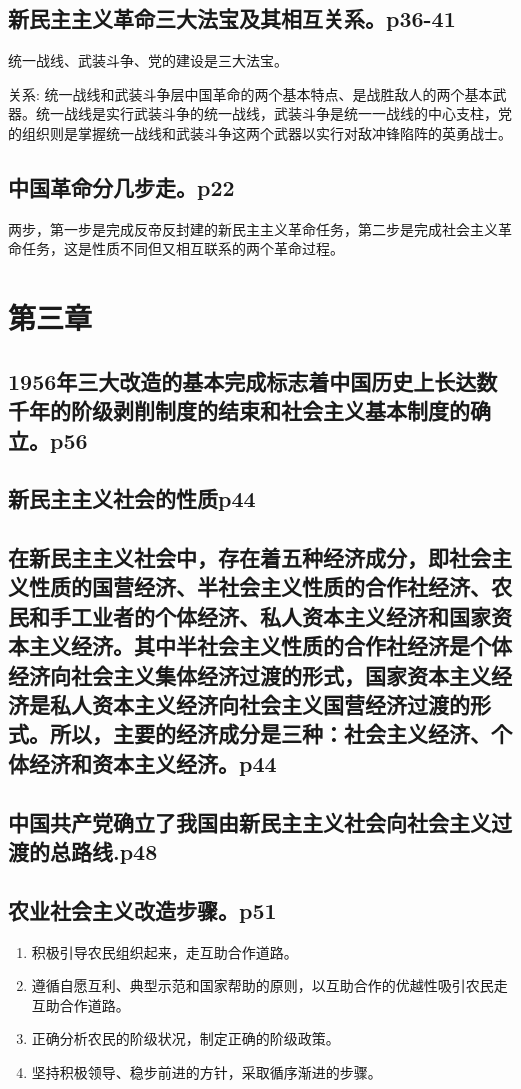 \documentclass[UTF8]{ctexart}
\begin{document}
\subsection{新民主主义革命三大法宝及其相互关系。p36-41}
\par 统一战线、武装斗争、党的建设是三大法宝。
\par 关系:  统一战线和武装斗争层中国革命的两个基本特点、是战胜敌人的两个基本武器。统一战线是实行武装斗争的统一战线，武装斗争是统一一战线的中心支柱，党的组织则是掌握统一战线和武装斗争这两个武器以实行对敌冲锋陷阵的英勇战士。
\subsection{中国革命分几步走。p22}
\par 两步，第一步是完成反帝反封建的新民主主义革命任务，第二步是完成社会主义革命任务，这是性质不同但又相互联系的两个革命过程。
\section{第三章}
\subsection{1956年三大改造的基本完成标志着中国历史上长达数千年的阶级剥削制度的结束和社会主义基本制度的确立。p56}
\subsection{新民主主义社会的性质p44}
\subsection{在新民主主义社会中，存在着五种经济成分，即社会主义性质的国营经济、半社会主义性质的合作社经济、农民和手工业者的个体经济、私人资本主义经济和国家资本主义经济。其中半社会主义性质的合作社经济是个体经济向社会主义集体经济过渡的形式，国家资本主义经济是私人资本主义经济向社会主义国营经济过渡的形式。所以，主要的经济成分是三种：社会主义经济、个体经济和资本主义经济。p44}
\subsection{中国共产党确立了我国由新民主主义社会向社会主义过渡的总路线.p48}
\subsection{农业社会主义改造步骤。p51}
\begin{enumerate}[(1)]
\item  积极引导农民组织起来，走互助合作道路。
\item  遵循自愿互利、典型示范和国家帮助的原则，以互助合作的优越性吸引农民走互助合作道路。
\item  正确分析农民的阶级状况，制定正确的阶级政策。
\item  坚持积极领导、稳步前进的方针，采取循序渐进的步骤。
\end{enumerate}
\end{document}

